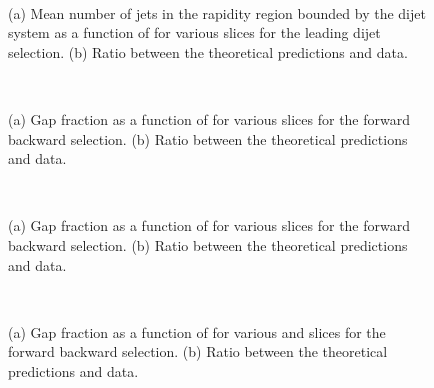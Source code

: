 \begin{figure}
\centering
\mbox{
              \quad
              \quad
}
\caption[Mean number of jets as a function of \ptb{} for leading $p_T$ dijet selection]{ 
(a) Mean number of jets in the rapidity region bounded by the dijet system as a function of \ptb{} for various \dy{} slices for the leading \pt{} dijet selection. 
(b) Ratio between the theoretical predictions and data.
\label{GBJ1:NjetspTSelA}}
\end{figure}


\begin{figure}
\centering
\mbox{
              \quad
              \quad
}
\caption[Gap fraction as a function of \dy{} for forward backward selection]{ 
(a) Gap fraction as a function of \dy{} for various \ptb{} slices for the forward backward selection. 
(b) Ratio between the theoretical predictions and data. 
\label{GBJ1:dYSelB}}
\end{figure}

\begin{figure}
\centering
\mbox{
              \quad
              \quad
}
\caption[Gap fraction as a function of \ptb{} for forward backward selection]{ 
(a) Gap fraction as a function of \ptb{} for various \dy{} slices for the forward backward selection. 
(b) Ratio between the theoretical predictions and data.
\label{GBJ1:pTSelB}}
\end{figure}

\begin{figure}
\centering
\mbox{
              \quad
              \quad
}
\caption[Gap fraction as a function of \qz{} for forward backward selection]{ 
(a) Gap fraction as a function of \qz{} for various \dy{} and \ptb{} slices for the forward backward selection. 
(b) Ratio between the theoretical predictions and data. 
\label{GBJ1:Q0SelB}}
\end{figure}


